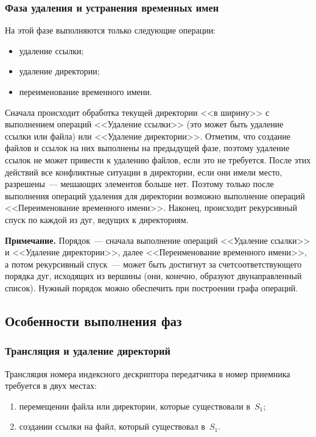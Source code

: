 \begin{multicols}{2}
\subsubsection{Фаза удаления и устранения временных имен} %
      
      На этой фазе выполняются только следующие операции:
      \begin{itemize}
\item удаление ссылки;
\item удаление директории;
\item переименование временного имени.
\end{itemize}

      Сначала происходит обработка текущей директории <<в ширину>> с 
выполнением операций <<Удаление ссылки>> (это может быть удаление 
ссылки или файла) или <<Удаление директории>>. Отметим, что создание 
файлов и ссылок на них выполнены на предыдущей фазе, поэтому удаление 
ссылок не может привести к удалению файлов, если это не требуется. После 
этих действий все конфликтные ситуации в директории, если они имели место, 
разрешены~---  мешающих элементов больше нет. Поэтому только после 
выполнения операций удаления для директории возможно выполнение 
операций <<Переименование временного имени>>. Наконец, происходит 
рекурсивный спуск по каждой из дуг, ведущих к директориям.
      
      \smallskip
      
      \noindent
{\sf      \textbf{Примечание.} 
Порядок~--- сначала выполнение операций 
<<Удаление ссылки>> и <<Удаление директории>>, далее <<Переименование 
временного имени>>, а потом рекурсивный спуск~--- может быть достигнут за 
счет\linebreak соответствующего порядка дуг, исходящих из вершины (они, конечно, 
образуют двунаправленный список). Нужный порядок можно обеспечить при 
построении графа операций.}

\subsection{Особенности выполнения фаз}

\subsubsection{Трансляция и удаление директорий} %
      
      Трансляция номера индексного дескриптора передатчика в номер 
приемника требуется в двух \mbox{местах:}
      \begin{enumerate}[(1)]
\item перемещении файла или директории, которые существовали в~$S_1$;
\item создании ссылки на файл, который существовал в~$S_1$.
\end{enumerate}


\end{multicols}

